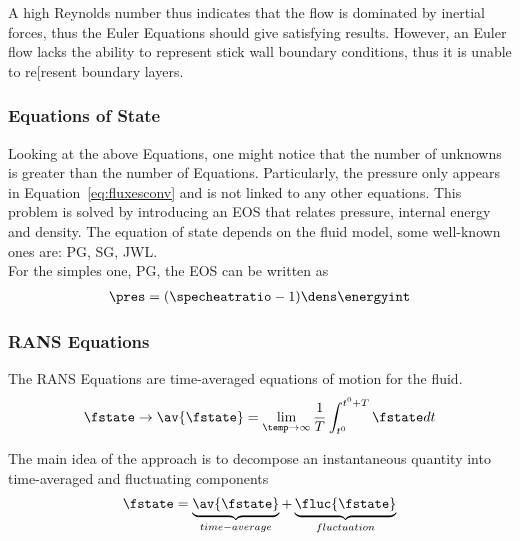 \documentclass[../main.tex]{subfiles}
\begin{document}
A high Reynolds number thus indicates that the flow is dominated by inertial forces, thus the Euler Equations should give satisfying results. However, an Euler flow lacks the ability to represent stick wall boundary conditions, thus it is unable to re[resent boundary layers.

\subsubsection{Equations of State}
Looking at the above Equations, one might notice that the number of unknowns is greater than the number of Equations. Particularly, the pressure only appears in Equation~\eqref{eq:fluxesconv} and is not linked to any other equations. This problem is solved by introducing an \acf{EOS} that relates pressure, internal energy and density. The equation of state depends on the fluid model, some well-known ones are: \ac{PG}, \ac{SG}, \ac{JWL}.\\
For the simples one, PG, the \ac{EOS} can be written as
\begin{align}\label{eq:eos_pg}
\pres=(\specheatratio-1)\dens\energyint
\end{align}


\subsubsection{\acl{RANS} Equations}
The \acf{RANS} Equations are time-averaged equations of motion for the fluid.
\begin{align}\label{eq:rans_averaging}
\fstate \rightarrow \av{\fstate} = \lim_{\temp \to \infty} \frac{1}{T} \int_{t^0}^{t^0+T} \fstate dt
\end{align}

The main idea of the approach is to decompose an instantaneous quantity into time-averaged and fluctuating components
\begin{align}\label{eq:rans_decomposition}
\fstate=\underbrace{\av{\fstate}}_{time-average}+\underbrace{\fluc{\fstate}}_{fluctuation}
\end{align}
\end{document}

